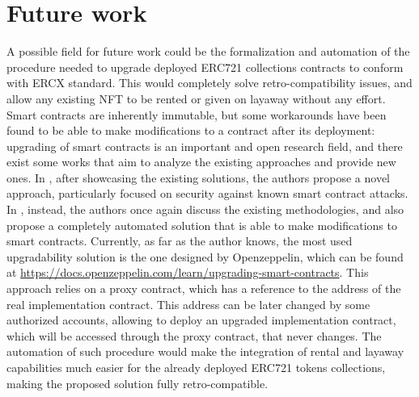 \documentclass[english, LaM, oneside]{sapthesis}%
\begin{document}
 \section{Future work}
 A possible field for future work could be the formalization and automation of the procedure needed to upgrade deployed ERC721 collections contracts to conform with ERCX standard. This would completely solve retro-compatibility issues, and allow any existing NFT to be rented or given on layaway without any effort. \newline
 Smart contracts are inherently immutable, but some workarounds have been found to be able to make modifications to a contract after its deployment: upgrading of smart contracts is an important and open research field, and there exist some works that aim to analyze the existing approaches and provide new ones. In \cite{ref:SCupgrade1}, after showcasing the existing solutions, the authors propose a novel approach, particularly focused on security against known smart contract attacks. In \cite{ref:SCupgrade2}, instead, the authors once again discuss the existing methodologies, and also propose a completely automated solution that is able to make modifications to smart contracts. Currently, as far as the author knows, the most used upgradability solution is the one designed by Openzeppelin, which can be found at \url{https://docs.openzeppelin.com/learn/upgrading-smart-contracts}. This approach relies on a proxy contract, which has a reference to the address of the real implementation contract. This address can be later changed by some authorized accounts, allowing to deploy an upgraded implementation contract, which will be accessed through the proxy contract, that never changes.\newline
 The automation of such procedure would make the integration of rental and layaway capabilities much easier for the already deployed ERC721 tokens collections, making the proposed solution fully retro-compatible.
\end{document}
